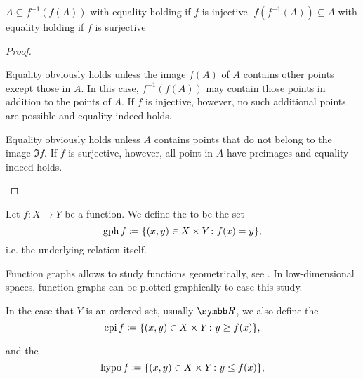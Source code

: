 \begin{proposition}\label{thm:function_image_preimage_composition}\mbox{}
  \begin{propenum}
     \( A \subseteq f^{-1}(f(A)) \) with equality holding if \( f \) is injective.
     \( f(f^{-1}(A)) \subseteq A \) with equality holding if \( f \) is surjective
  \end{propenum}
\end{proposition}
\begin{proof}\mbox{}
  \begin{description}
     Equality obviously holds unless the image \( f(A) \) of \( A \) contains other points except those in \( A \). In this case, \( f^{-1}(f(A)) \) may contain those points in addition to the points of \( A \). If \( f \) is injective, however, no such additional points are possible and equality indeed holds.

     Equality obviously holds unless \( A \) contains points that do not belong to the image \( \Im f \). If \( f \) is surjective, however, all point in \( A \) have preimages and equality indeed holds.
  \end{description}
\end{proof}

\begin{definition}\label{def:function_graph}
  Let \( f: X \to Y \) be a function. We define the  to be the set
  \begin{equation*}
    \operatorname{gph} f \coloneqq \{ (x, y) \in X \times Y \colon f(x) = y \},
  \end{equation*}
  i.e. the underlying relation itself.

  Function graphs allows to study functions geometrically, see . In low-dimensional spaces, function graphs can be plotted graphically to ease this study.

  In the case that \( Y \) is an ordered set, usually \( \BR \), we also define the 
  \begin{equation*}
    \operatorname{epi} f \coloneqq \{ (x, y) \in X \times Y \colon y \geq f(x) \},
  \end{equation*}

  and the 
  \begin{equation*}
    \operatorname{hypo} f \coloneqq \{ (x, y) \in X \times Y \colon y \leq f(x) \},
  \end{equation*}
\end{definition}

